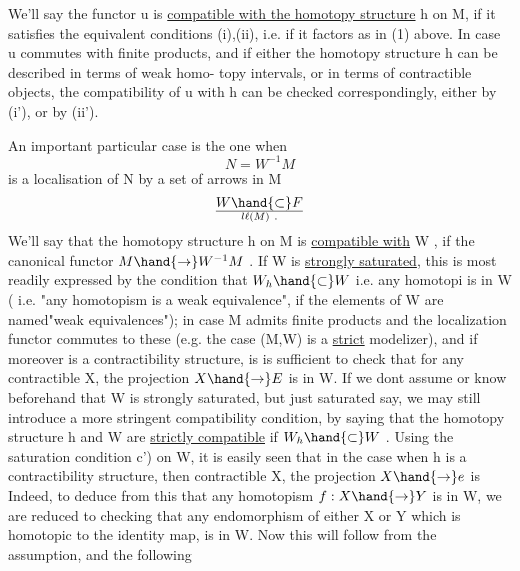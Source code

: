 
We'll say the functor u is \uline{compatible with the homotopy structure} h
on M, if it satisfies the equivalent conditions (i),(ii), i.e. if it
factors as in (1) above. In case u commutes with finite products, and
if either the homotopy structure h can be described in terms of weak homo-%
topy intervals, or in terms of contractible objects, the compatibility
of u with h can be checked correspondingly, either by (i'), or by (ii').

 An important particular case is the one when
\[ N = W^{-1}M \]
is a localisation of N by a set of arrows in M
\[ W \hand{\subset} F\over{l}{\ell}(M) \ . \]
We'll say that the homotopy structure h on M is \uline{compatible with} W , if
 the canonical functor $M \hand{\to} W^{-1}M$ . If W is \uline{strongly saturated}, this
is most readily expressed by the condition that $W_h \hand{\subset} W$ i.e. any homotopi
is in W ( i.e.  "any homotopism is a weak equivalence", if the elements
of W are named"weak equivalences"); in case M admits finite products and
the localization functor commutes to these (e.g. the case (M,W) is a
\uline{strict} modelizer),  and if moreover  is a
contractibility structure,  is is sufficient to check that
for any contractible X, the projection $X \hand{\to} E$ is in W. If we dont assume
or know beforehand that W is strongly saturated, but just saturated say,
we may still introduce a more stringent compatibility condition, by
saying that  the homotopy structure h and W are \uline{strictly compatible}
if $W_h \hand{\subset} W$ . Using the  saturation condition c') on W, it is easily
seen that in the case  when h is a contractibility structure, 
 then  
 contractible X, the projection $X \hand{\to} e$ is  \hand{,}
Indeed, to deduce from this that any homotopism $f: X \hand{\to} Y$ is in W, we
are reduced to checking that any endomorphism of either X or Y which is
homotopic to the identity map, is in W. Now this will follow from the
assumption, and the following

